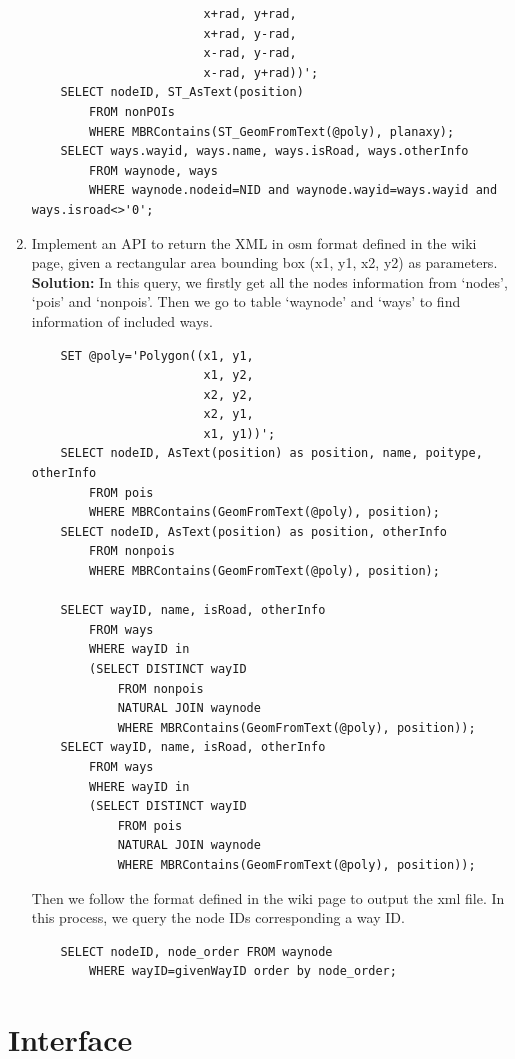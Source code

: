 \documentclass[final,1p,times]{elsarticle}
\begin{document}
\begin{enumerate}
\begin{verbatim}
                        x+rad, y+rad, 
                        x+rad, y-rad, 
                        x-rad, y-rad, 
                        x-rad, y+rad))';
    SELECT nodeID, ST_AsText(position)
        FROM nonPOIs
        WHERE MBRContains(ST_GeomFromText(@poly), planaxy);
    SELECT ways.wayid, ways.name, ways.isRoad, ways.otherInfo
        FROM waynode, ways
        WHERE waynode.nodeid=NID and waynode.wayid=ways.wayid and ways.isroad<>'0';
  \end{verbatim}
  \item Implement an API to return the XML in osm format defined in the wiki page, given a rectangular area bounding box (x1, y1, x2, y2) as parameters.\\
  \textbf{Solution:} In this query, we firstly get all the nodes information from `nodes', `pois' and `nonpois'. Then we go to table `waynode' and `ways' to find information of included ways.
  \begin{verbatim}
    SET @poly='Polygon((x1, y1, 
                        x1, y2, 
                        x2, y2, 
                        x2, y1, 
                        x1, y1))';
    SELECT nodeID, AsText(position) as position, name, poitype, otherInfo 
        FROM pois 
        WHERE MBRContains(GeomFromText(@poly), position);
    SELECT nodeID, AsText(position) as position, otherInfo 
        FROM nonpois 
        WHERE MBRContains(GeomFromText(@poly), position);

    SELECT wayID, name, isRoad, otherInfo 
        FROM ways 
        WHERE wayID in 
        (SELECT DISTINCT wayID 
            FROM nonpois 
            NATURAL JOIN waynode 
            WHERE MBRContains(GeomFromText(@poly), position));
    SELECT wayID, name, isRoad, otherInfo
        FROM ways
        WHERE wayID in 
        (SELECT DISTINCT wayID 
            FROM pois 
            NATURAL JOIN waynode 
            WHERE MBRContains(GeomFromText(@poly), position));
  \end{verbatim}
  Then we follow the format defined in the wiki page to output the xml file. In this process, we query the node IDs corresponding a way ID.
  \begin{verbatim}
    SELECT nodeID, node_order FROM waynode
        WHERE wayID=givenWayID order by node_order;
  \end{verbatim}
\end{enumerate}


\section{Interface}
\end{document}
